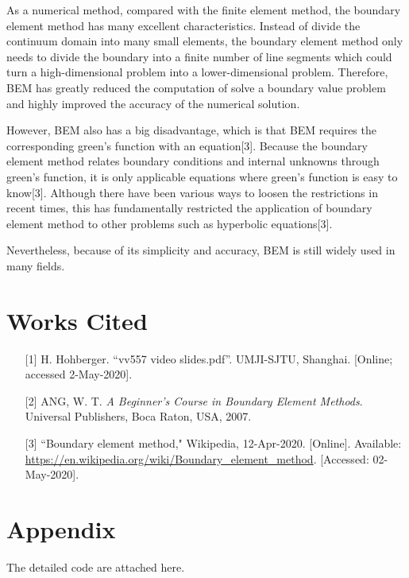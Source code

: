 \documentclass[a4paper,12pt]{article}
\begin{document}
\par As a numerical method, compared with the finite element method, the boundary element method has many excellent characteristics. Instead of divide the continuum domain into many small elements, the boundary element method only needs to divide the boundary into a finite number of line segments which could turn a high-dimensional problem into a lower-dimensional problem. Therefore, BEM has greatly reduced the computation of solve a boundary value problem and highly improved the accuracy of the numerical solution. 

\par However, BEM also has a big disadvantage, which is that BEM requires the corresponding green's function with an equation[3]. Because the boundary element method relates boundary conditions and internal unknowns through green's function, it is only applicable equations where green's function is easy to know[3]. Although there have been various ways to loosen the restrictions in recent times, this has fundamentally restricted the application of boundary element method to other problems such as hyperbolic equations[3].

\par Nevertheless, because of its simplicity and accuracy, BEM is still widely used in many fields.
\section{Works Cited}
\begin{itemize}
\item[{[}1{]}]H. Hohberger. ``vv557 video slides.pdf”. UMJI-SJTU, Shanghai. [Online; accessed 2-May-2020].
\item[{[}2{]}]
ANG, W. T. \textit{A Beginner’s Course in Boundary Element Methods}. Universal Publishers, Boca Raton, USA, 2007.
\item[{[}3{]}]
``Boundary element method," Wikipedia, 12-Apr-2020. [Online]. Available: \url{https://en.wikipedia.org/wiki/Boundary_element_method}. [Accessed: 02-May-2020].
\end{itemize}

\section{Appendix}
The detailed code are attached here.
\end{document}
